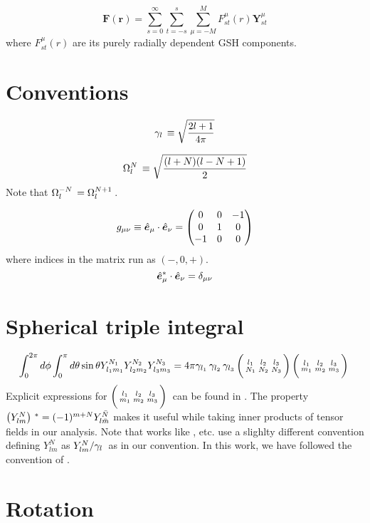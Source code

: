 \begin{equation}
\mathbf{F}(\mathbf{r}) = \sum_{s=0}^{\infty} \sum_{t=-s}^{s}\sum_{\mu=-M}^{M} F_{st}^{\mu}(r) \mathbf{Y}_{st}^{\mu}
\end{equation}
where $F_{st}^{\mu}(r)$ are its purely radially dependent GSH components.
\section{Conventions}\label{app_conventions}
\begin{equation}
\gamma_{l}\, \equiv \sqrt{\frac{2l+1}{4\pi}}
\end{equation}

\begin{equation}
\Omega_{l}^{N}\, \equiv \sqrt{\frac{(l+N)(l-N+1)}{2}}
\end{equation}
Note that $\Omega_{l}^{-N}\, = \Omega_{l}^{N+1}\,$.

\begin{equation}
g_{\mu\nu} \equiv \hat{\bm{e}}_{\mu}\cdot \hat{\bm{e}}_{\nu} = \left( \begin{matrix}
0 & 0 & -1 \\
0 & 1& 0  \\
-1 & 0 & 0
\end{matrix} \right)
\end{equation}
where indices in the matrix run as $(-,0,+)$.
\begin{equation}
\hat{\bm{e}}_{\mu}^* \cdot \hat{\bm{e}}_{\nu} = \delta_{\mu\nu}
\end{equation}

\section{Spherical triple integral}
\begin{equation}
\int_0^{2\pi} d\phi \int_{0}^{\pi} d\theta\sin\theta Y_{l_1m_1}^{N_1}Y_{l_2m_2}^{N_2}Y_{l_3m_3}^{N_3} = 4\pi \gamma_{l_1}\,\gamma_{l_2}\,\gamma_{l_3}\, \bigg(\begin{smallmatrix} l_1 & l_2 & l_3 \\N_1 & N_2 & N_3 \end{smallmatrix}\bigg)\, \bigg(\begin{smallmatrix} l_1 & l_2 & l_3 \\m_1 & m_2 & m_3 \end{smallmatrix}\bigg)\,
\end{equation}
Explicit expressions for $\bigg(\begin{smallmatrix} l_1 & l_2 & l_3 \\m_1 & m_2 & m_3 \end{smallmatrix}\bigg)\,$ can be found in \cite{DT98}. The property $\left( Y_{lm}^{N} \right)\,^* = (-1)^{m+N}Y_{l\bar{m}}^{\bar{N}}$ makes it useful while taking inner products of tensor fields in our analysis.
Note that works like \cite{lavely92}, \cite{hanasoge17} etc. use a slighlty different convention defining $Y_{lm}^{N}$ as $Y_{lm}^{N}/\gamma_{l}\,$ as in our convention. In this work, we have followed the convention of \cite{DT98}.
\section{Rotation}

